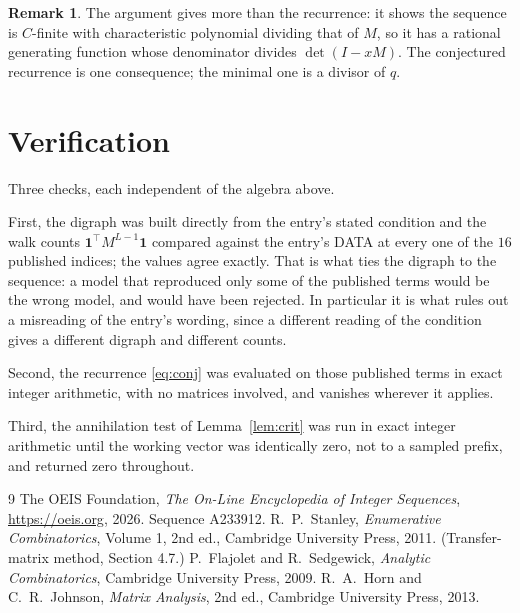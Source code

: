 \documentclass[11pt,a4paper]{article}
\theoremstyle{plain}
\theoremstyle{definition}
\newtheorem{remark}[theorem]{Remark}
\begin{document}
\begin{remark}
The argument gives more than the recurrence: it shows the sequence is $C$-finite with
characteristic polynomial dividing that of $M$, so it has a rational generating function
whose denominator divides $\det(I-xM)$. The conjectured recurrence is one consequence; the
minimal one is a divisor of $q$.
\end{remark}

\section{Verification}

Three checks, each independent of the algebra above.

First, the digraph was built directly from the entry's stated condition and the walk counts
$\mathbf{1}^{\!\top}M^{L-1}\mathbf{1}$ compared against the entry's DATA at
every one of the $16$ published indices; the values agree exactly. That is what ties
the digraph to the sequence: a model that reproduced only some of the published terms would
be the wrong model, and would have been rejected. In particular it is what rules out a
misreading of the entry's wording, since a different reading of the condition gives a
different digraph and different counts.

Second, the recurrence \eqref{eq:conj} was evaluated on those published terms in exact
integer arithmetic, with no matrices involved, and vanishes wherever it applies.

Third, the annihilation test of Lemma~\ref{lem:crit} was run in exact integer arithmetic
until the working vector was identically zero, not to a sampled prefix, and returned zero
throughout.

\begin{thebibliography}{9}
 The OEIS Foundation, \emph{The On-Line Encyclopedia of Integer
Sequences}, \url{https://oeis.org}, 2026. Sequence A233912.
 R.~P.~Stanley, \emph{Enumerative Combinatorics}, Volume 1, 2nd ed.,
Cambridge University Press, 2011. (Transfer-matrix method, Section 4.7.)
 P.~Flajolet and R.~Sedgewick, \emph{Analytic Combinatorics}, Cambridge
University Press, 2009.
 R.~A.~Horn and C.~R.~Johnson, \emph{Matrix Analysis}, 2nd ed., Cambridge
University Press, 2013.
\end{thebibliography}
\end{document}
